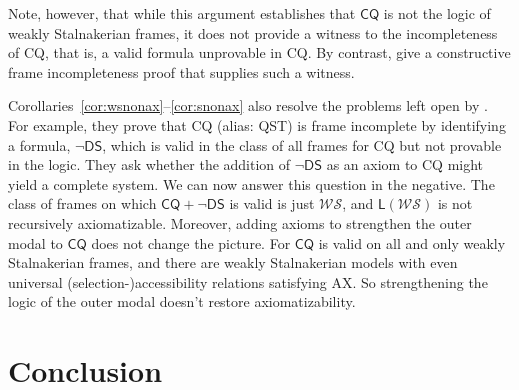 \documentclass[12pt]{article}
\newtheorem{corollary}{Corollary}
\newcommand{\Ax}{\text{AX}}
\begin{document}
\noindent Note, however, that while this argument establishes that $\mathsf{CQ}$ is not the logic of weakly Stalnakerian frames, it does not provide a witness to the incompleteness of \textsf{CQ}, that is, a valid formula unprovable in \textsf{CQ}. 
By contrast, \cite{KocurekWalshWeissA} give a constructive frame incompleteness proof that supplies such a witness. 

Corollaries~\ref{cor:wsnonax}--\ref{cor:snonax} also resolve the problems left open by \cite[Section~6]{KocurekWalshWeissA}. 
For example, they prove that \textsf{CQ} (alias: \textsf{QST}) is frame incomplete by identifying a formula, $\neg\mathsf{DS}$, which is valid in the class of all frames for \textsf{CQ} but not provable in the logic. 
They ask whether the addition of $\neg\mathsf{DS}$ as an axiom to \textsf{CQ} might yield a complete system. 
We can now answer this question in the negative. 
The class of frames on which $\mathsf{CQ}+\neg\mathsf{DS}$ is valid is just $\mathcal{WS}$, and $\mathsf{L}(\mathcal{WS})$ is not recursively axiomatizable. 
Moreover, adding axioms to strengthen the outer modal to $\mathsf{CQ}$ does not change the picture. 
For $\mathsf{CQ}$ is valid on all and only weakly Stalnakerian frames, and there are weakly Stalnakerian models with even universal (selection-)accessibility relations satisfying $\Ax$. 
So strengthening the logic of the outer modal doesn't restore axiomatizability. 




\section{Conclusion}
\label{sec:conc}
\end{document}
